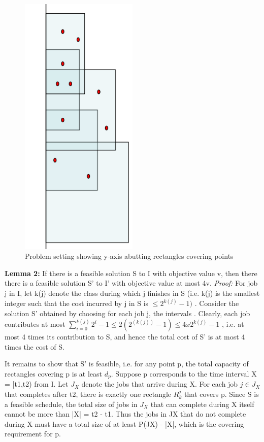 \documentclass[11pt, a4paper, notitlepage, oneside]{article}
\begin{document}
{\begin{figure}[!h]
\caption{Problem setting showing y-axis abutting rectangles covering points}
\centering
\includegraphics[width=0.5\textwidth]{r2c}
\end{figure}


\textbf{Lemma 2:} If there is a feasible solution S to I with objective value v, then there there is a feasible solution S' to I' with objective value at most 4v.
\textit{Proof:} For job j in I, let k(j) denote the class during which j finishes in S (i.e. k(j) is the smallest integer such that the cost incurred by j in S is  $ \leq 2^{k(j)} - 1)$ . Consider the solution S' obtained by choosing for each job j, the intervals . Clearly, each job contributes at most $ \sum_{i=0}^{k(j)} 2^i - 1 \leq 2(2^(k(j)) - 1) \leq  4x2^{k(j)}-1 $ , i.e. at most 4 times its contribution to S, and hence the total cost of S' is at most 4 times the cost of S.

It remains to show that S' is feasible, i.e. for any point p, the total capacity of rectangles covering p is at least $d_p$. Suppose p corresponds to the time interval X = [t1,t2) from I. Let $J_X$ denote the jobs that arrive during X. For each job $j \in J_X$ that completes after t2, there is exactly one rectangle $R_k^j$ that covers p. Since S is a feasible schedule, the total size of jobs in $J_X$ that can complete during X itself cannot be more than |X| = t2 - t1. Thus the jobs in JX that do not complete during X must have a total size of at least P(JX) - |X|, which is the covering requirement for p.

}
\end{document}
